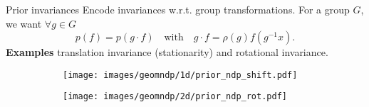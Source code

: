 \begin{frame}{Prior invariances}
Encode invariances w.r.t. group transformations. For a group $G$, we want $\forall g \in G$
\begin{equation*}
p(f) = p(g\cdot f) \quad\text{with}\quad g \cdot f = \rho(g) f (g^{-1} x).
\end{equation*}
\pause
\textbf{Examples} translation invariance (stationarity) and rotational invariance.
\begin{figure}[t]
\centering
\begin{subfigure}[b]{0.45\textwidth}
\centering
\texttt{[image: images/geomndp/1d/prior\_ndp\_shift.pdf]}
\end{subfigure}%
\hspace{0.3cm}
\begin{subfigure}[b]{0.45\textwidth}
\centering
\texttt{[image: images/geomndp/2d/prior\_ndp\_rot.pdf]}
\vspace{-.75em}
\end{subfigure}
\label{fig:prior_model}
\end{figure}
\end{frame}


